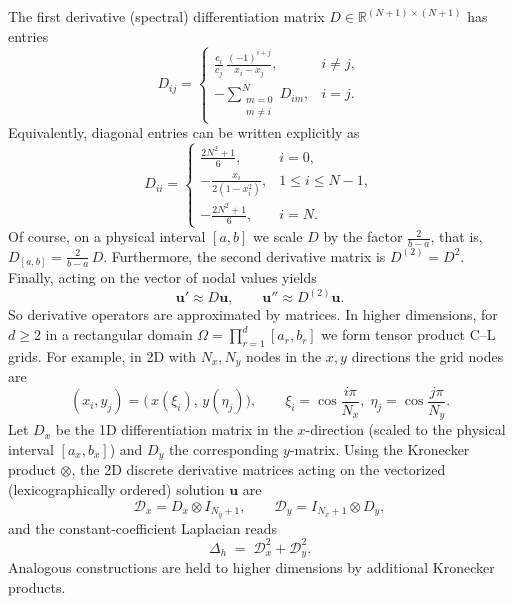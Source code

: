 \documentclass[12pt,a4paper]{article}
\begin{document}
The first derivative (spectral) differentiation matrix \(D\in\mathbb{R}^{(N+1)\times(N+1)}\) has entries 
\begin{equation}
	D_{ij} = 
	\begin{cases}
		\displaystyle \frac{c_i}{c_j}\,\frac{(-1)^{i+j}}{x_i-x_j}, & i\neq j,\\[8pt]
		\displaystyle -\sum_{\substack{m=0\\ m\neq i}}^N D_{im}, & i=j.
	\end{cases}
\end{equation}
Equivalently, diagonal entries can be written explicitly as
\begin{equation}
	D_{ii} = 
	\begin{cases}
		\displaystyle \frac{2N^2+1}{6}, & i=0, \\[6pt]
		\displaystyle -\frac{x_i}{2(1-x_i^2)}, & 1\le i\le N-1,\\[6pt]
		\displaystyle -\frac{2N^2+1}{6}, & i=N.
	\end{cases}
\end{equation}
Of course, on a physical interval \([a,b]\) we scale \(D\) by the factor \(\frac{2}{b-a}\), that is, \(D_{[a,b]} = \frac{2}{b-a}\,D\). Furthermore, the second derivative matrix is \(D^{(2)}=D^2\). Finally, acting on the vector of nodal values yields
\begin{equation}
	\mathbf{u}' \approx D\mathbf{u},\qquad \mathbf{u}'' \approx D^{(2)}\mathbf{u}.
\end{equation}
So derivative operators are approximated by matrices. In higher dimensions, for \(d\ge 2\) in a rectangular domain \(\Omega=\prod_{r=1}^d[a_r,b_r]\) we form tensor product C--L grids. For example, in 2D with \(N_x,N_y\) nodes in the \(x,y\) directions the grid nodes are
\begin{equation}
	(x_i,y_j) = \Big( \,x(\xi_i),\, y(\eta_j)\Big),\qquad \xi_i=\cos\frac{i\pi}{N_x},\;\eta_j=\cos\frac{j\pi}{N_y}.
\end{equation}
Let \(D_x\) be the 1D differentiation matrix in the \(x\)-direction (scaled to the physical interval \([a_x,b_x]\)) and \(D_y\) the corresponding \(y\)-matrix. Using the Kronecker product $\otimes$, the 2D discrete derivative matrices acting on the vectorized (lexicographically ordered) solution \(\mathbf{u}\) are
\begin{equation}
	\mathcal{D}_x = D_x \otimes I_{N_y+1}, \qquad	\mathcal{D}_y = I_{N_x+1} \otimes D_y,
\end{equation}
and the constant-coefficient Laplacian reads
\begin{equation}
	\Delta_h \;=\; \mathcal{D}_x^2 + \mathcal{D}_y^2.
\end{equation}
Analogous constructions are held to higher dimensions by additional Kronecker products.
\end{document}
